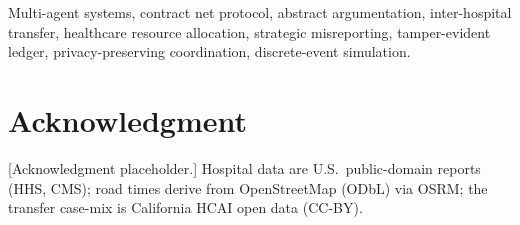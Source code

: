 \documentclass[journal]{IEEEtran}
\begin{document}
\begin{IEEEkeywords}
Multi-agent systems, contract net protocol, abstract argumentation, inter-hospital transfer, healthcare resource allocation, strategic misreporting, tamper-evident ledger, privacy-preserving coordination, discrete-event simulation.
\end{IEEEkeywords}












\appendices


\section*{Acknowledgment}
[Acknowledgment placeholder.] Hospital data are U.S.\ public-domain reports (HHS, CMS); road times derive from OpenStreetMap (ODbL) via OSRM; the transfer case-mix is California HCAI open data (CC-BY).


\end{document}

